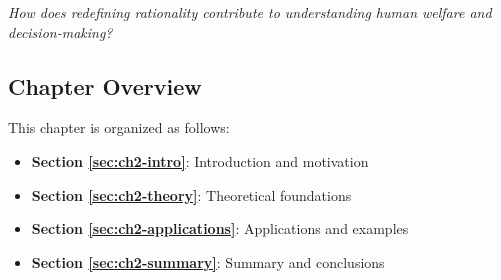 \begin{tcolorbox}[
    colback=red!5!white,
    colframe=red!75!black,
    title={\textbf{Central Question}},
    fonttitle=\bfseries
]
\Large
\centering
\textit{How does redefining rationality contribute to understanding human welfare and decision-making?}
\end{tcolorbox}



\subsection*{Chapter Overview}

This chapter is organized as follows:

\begin{itemize}
\item \textbf{Section \ref{sec:ch2-intro}}: Introduction and motivation
\item \textbf{Section \ref{sec:ch2-theory}}: Theoretical foundations
\item \textbf{Section \ref{sec:ch2-applications}}: Applications and examples
\item \textbf{Section \ref{sec:ch2-summary}}: Summary and conclusions
\end{itemize}




